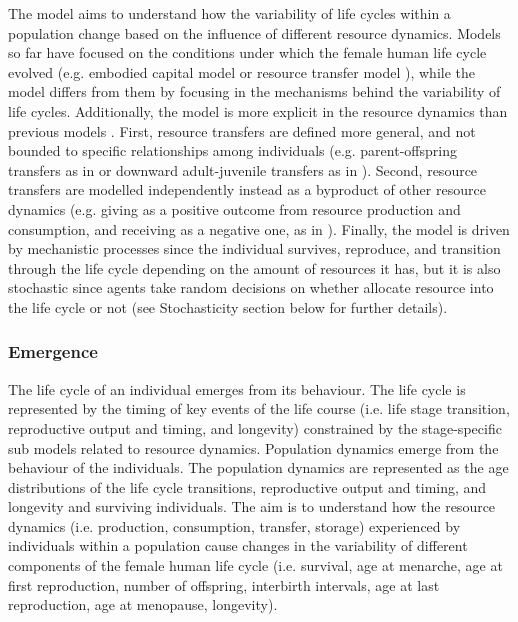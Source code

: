 \documentclass{article}
\begin{document}
The model aims to understand how the variability of life cycles within a population change based on the influence of different resource dynamics. Models so far have focused on the conditions under which the female human life cycle evolved (e.g. embodied capital model \citep{kaplan1996theory} or resource transfer model \citep{chu2006co}), while the model differs from them by focusing in the mechanisms behind the variability of life cycles. Additionally, the model is more explicit in the resource dynamics than previous models \citep{price2020fitness,kaplan1996theory,chu2006co,lee2003rethinking,kramer2010pooled}. First, resource transfers are defined more general, and not bounded to specific relationships among individuals (e.g. parent-offspring transfers as in \cite{kaplan1996theory} or downward adult-juvenile transfers as in \cite{chu2006co}). Second, resource transfers are modelled independently instead as a byproduct of other resource dynamics (e.g. giving as a positive outcome from resource production and consumption, and receiving as a negative one, as in \cite{lee2003rethinking,chu2006co}). Finally, the model is driven by mechanistic processes since the individual survives, reproduce, and transition through the life cycle depending on the amount of resources it has, but it is also stochastic since agents take random decisions on whether allocate resource into the life cycle or not (see Stochasticity section below for further details).


\subsubsection{Emergence}

The life cycle of an individual emerges from its behaviour. The life cycle is represented by the timing of key events of the life course (i.e. life stage transition, reproductive output and timing, and longevity) constrained by the stage-specific sub models related to resource dynamics. Population dynamics emerge from the behaviour of the individuals. The population dynamics are represented as the age distributions of the life cycle transitions, reproductive output and timing, and longevity and surviving individuals. The aim is to understand how the resource dynamics (i.e. production, consumption, transfer, storage) experienced by individuals within a population cause changes in the variability of different components of the female human life cycle (i.e. survival, age at menarche, age at first reproduction, number of offspring, interbirth intervals, age at last reproduction, age at menopause, longevity).
\end{document}
